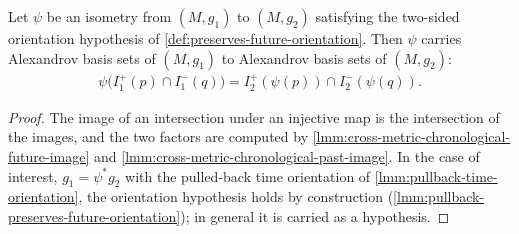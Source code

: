 \begin{lemma}
    \label{lmm:cross-metric-isometry-preserves-basis-sets}
    Let $\psi$ be an isometry from $(M,g_1)$ to $(M,g_2)$ satisfying the two-sided orientation hypothesis of \ref{def:preserves-future-orientation}. Then $\psi$ carries Alexandrov basis sets of $(M,g_1)$ to Alexandrov basis sets of $(M,g_2)$:
    \begin{align}
        \psi\big(I^+_1(p) \cap I^-_1(q)\big) = I^+_2(\psi(p)) \cap I^-_2(\psi(q)).
    \end{align}
\end{lemma}
\begin{proof}
    The image of an intersection under an injective map is the intersection of the images, and the two factors are computed by \ref{lmm:cross-metric-chronological-future-image} and \ref{lmm:cross-metric-chronological-past-image}. In the case of interest, $g_1 = \psi^*g_2$ with the pulled-back time orientation of \ref{lmm:pullback-time-orientation}, the orientation hypothesis holds by construction (\ref{lmm:pullback-preserves-future-orientation}); in general it is carried as a hypothesis.
\end{proof}

